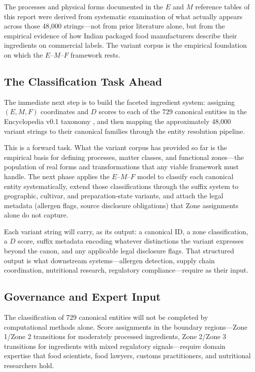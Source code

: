 \documentclass[12pt,a3paper]{article}
\begin{document}
The processes and physical forms documented in the $E$ and $M$ reference tables of this report were derived from systematic examination of what actually appears across those 48,000 strings---not from prior literature alone, but from the empirical evidence of how Indian packaged food manufacturers describe their ingredients on commercial labels. The variant corpus is the empirical foundation on which the $E$--$M$--$F$ framework rests.

\subsection{The Classification Task Ahead}

The immediate next step is to build the faceted ingredient system: assigning $(E, M, F)$ coordinates and $D$ scores to each of the 729 canonical entities in the Encyclopedia v0.1 taxonomy \cite{EncyclopediaV01}, and then mapping the approximately 48,000 variant strings to their canonical families through the entity resolution pipeline.

This is a forward task. What the variant corpus has provided so far is the empirical basis for defining processes, matter classes, and functional zones---the population of real forms and transformations that any viable framework must handle. The next phase applies the $E$--$M$--$F$ model to classify each canonical entity systematically, extend those classifications through the suffix system to geographic, cultivar, and preparation-state variants, and attach the legal metadata (allergen flags, source disclosure obligations) that Zone assignments alone do not capture.

Each variant string will carry, as its output: a canonical ID, a zone classification, a $D$ score, suffix metadata encoding whatever distinctions the variant expresses beyond the canon, and any applicable legal disclosure flags. That structured output is what downstream systems---allergen detection, supply chain coordination, nutritional research, regulatory compliance---require as their input.

\subsection{Governance and Expert Input}

The classification of 729 canonical entities will not be completed by computational methods alone. Score assignments in the boundary regions---Zone 1/Zone 2 transitions for moderately processed ingredients, Zone 2/Zone 3 transitions for ingredients with mixed regulatory signals---require domain expertise that food scientists, food lawyers, customs practitioners, and nutritional researchers hold.
\end{document}
